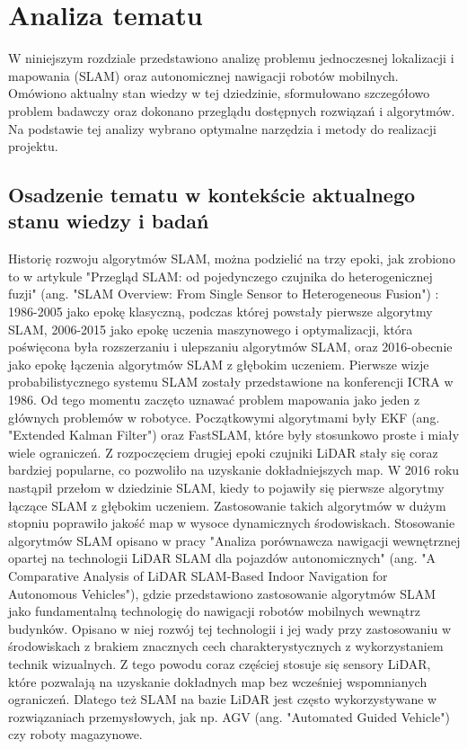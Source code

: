 \documentclass[a4paper,twoside,12pt]{book}
\begin{document}
\chapter{Analiza tematu}
\label{ch:Analiza-Tematu}
W niniejszym rozdziale przedstawiono analizę problemu jednoczesnej lokalizacji i mapowania (SLAM) oraz autonomicznej nawigacji robotów mobilnych. Omówiono aktualny stan wiedzy w tej dziedzinie, sformułowano szczegółowo problem badawczy oraz dokonano przeglądu dostępnych rozwiązań i algorytmów. Na podstawie tej analizy wybrano optymalne narzędzia i metody do realizacji projektu.

\section{Osadzenie tematu w kontekście aktualnego stanu wiedzy i badań}
Historię rozwoju algorytmów SLAM, można podzielić na trzy epoki, jak zrobiono to w artykule "Przegląd SLAM: od pojedynczego czujnika do heterogenicznej fuzji" (ang. "SLAM Overview: From Single Sensor to Heterogeneous Fusion") \cite{bib:rs14236033}: 1986-2005 jako epokę klasyczną, podczas której powstały pierwsze algorytmy SLAM, 2006-2015 jako epokę uczenia maszynowego i optymalizacji, która poświęcona była rozszerzaniu i ulepszaniu algorytmów SLAM, oraz 2016-obecnie jako epokę łączenia algorytmów SLAM z głębokim uczeniem. Pierwsze wizje probabilistycznego systemu SLAM zostały przedstawione na konferencji ICRA w 1986. Od tego momentu zaczęto uznawać problem mapowania jako jeden z głównych problemów w robotyce.
Początkowymi algorytmami były EKF (ang. "Extended Kalman Filter") oraz FastSLAM, które były stosunkowo proste i miały wiele ograniczeń. Z rozpoczęciem drugiej epoki czujniki LiDAR stały się coraz bardziej popularne, co pozwoliło na uzyskanie dokładniejszych map. W 2016 roku nastąpił przełom w dziedzinie SLAM, kiedy to pojawiły się pierwsze algorytmy łączące SLAM z głębokim uczeniem. Zastosowanie takich algorytmów w dużym stopniu poprawiło jakość map w wysoce dynamicznych środowiskach.
\newpage
Stosowanie algorytmów SLAM opisano w pracy  "Analiza porównawcza nawigacji wewnętrznej opartej na technologii LiDAR SLAM dla pojazdów autonomicznych" (ang. "A Comparative Analysis of LiDAR SLAM-Based Indoor Navigation for Autonomous Vehicles")\cite{bib:9381521}, gdzie przedstawiono zastosowanie algorytmów SLAM jako fundamentalną technologię do nawigacji robotów mobilnych wewnątrz budynków.
 Opisano w niej rozwój tej technologii i jej wady przy zastosowaniu w środowiskach z brakiem znacznych cech charakterystycznych z wykorzystaniem technik wizualnych. Z tego powodu coraz częściej stosuje się sensory LiDAR, które pozwalają na uzyskanie dokładnych map bez wcześniej wspomnianych ograniczeń. Dlatego też SLAM na bazie LiDAR jest często wykorzystywane w rozwiązaniach przemysłowych, jak np. AGV (ang. "Automated Guided Vehicle") czy roboty magazynowe.
\end{document}
